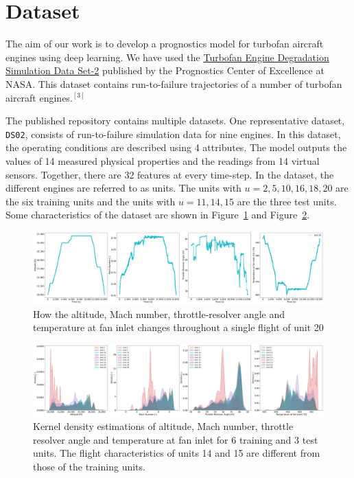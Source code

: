 \documentclass[a4paper,12pt]{article}
\begin{document}
\section{Dataset}

The aim of our work is to develop a prognostics model for turbofan aircraft
engines using deep learning. We have used the
\href{https://ti.arc.nasa.gov/tech/dash/groups/pcoe/prognostic-data-repository}
{Turbofan Engine Degradation Simulation Data Set-2} published by the Prognostics
Center of Excellence at NASA. This dataset contains run-to-failure trajectories
of a number of turbofan aircraft engines.\(^{[3]}\)

The published repository contains multiple datasets. One representative dataset,
\texttt{DS02}, consists of run-to-failure simulation data for nine engines. In
this dataset, the operating conditions are described using 4 attributes. The
model outputs the values of 14 measured physical properties and the readings
from 14 virtual sensors. Together, there are 32 features at every time-step. In
the dataset, the different engines are referred to as units. The units with
$u = 2, 5, 10, 16, 18, 20$ are the six training units and the units with
$u = 11, 14, 15$ are the three test units. Some characteristics of the dataset
are shown in Figure~\ref{fig:flight_profile} and Figure~\ref{fig:unit_kde}.

\begin{figure}
    \centering
    \includegraphics[width=\linewidth]{flight_profile.png}
    \caption{How the altitude, Mach number, throttle-resolver angle and temperature at fan inlet changes throughout a single flight of unit 20}
    \label{fig:flight_profile}
\end{figure}


\begin{figure}
    \centering
    \includegraphics[width=\linewidth]{kde.png}
    \caption{Kernel density estimations of altitude, Mach number, throttle resolver angle and temperature at fan inlet for 6 training and 3 test units. The flight characteristics of units 14 and 15 are different from those of the training units.}
    \label{fig:unit_kde}
\end{figure}
\end{document}
